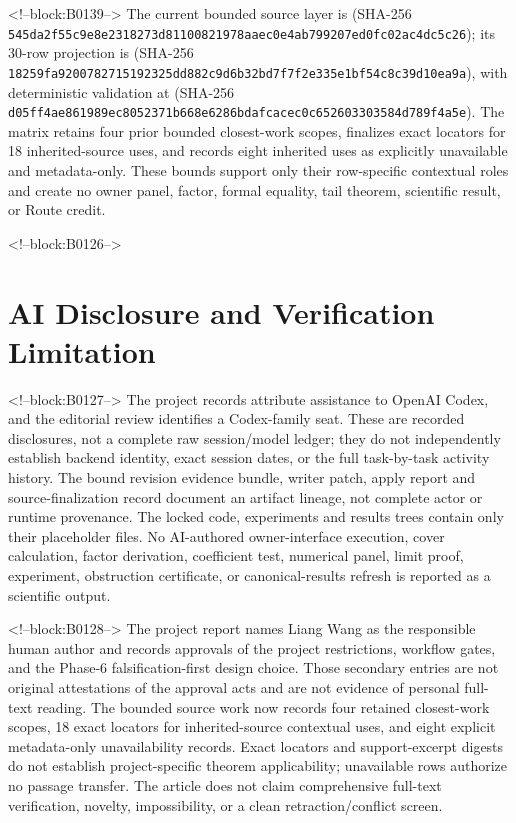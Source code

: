 \documentclass[11pt]{article}
\begin{document}
<!--block:B0139-->
The current bounded source layer is
 (SHA-256
\texttt{545da2f5\allowbreak{}5c9e8e23\allowbreak{}18273d81\allowbreak{}10082197\allowbreak{}8aaec0e4\allowbreak{}ab799207\allowbreak{}ed0fc02a\allowbreak{}c4dc5c26}); its 30-row projection is
 (SHA-256
\texttt{18259fa9\allowbreak{}20078271\allowbreak{}5192325d\allowbreak{}d882c9d6\allowbreak{}b32bd7f7\allowbreak{}f2e335e1\allowbreak{}bf54c8c3\allowbreak{}9d10ea9a}), with deterministic validation at
 (SHA-256
\texttt{d05ff4ae\allowbreak{}861989ec\allowbreak{}8052371b\allowbreak{}668e6286\allowbreak{}bdafcace\allowbreak{}c0c65260\allowbreak{}3303584d\allowbreak{}789f4a5e}).  The matrix retains four prior bounded
closest-work scopes, finalizes exact locators for 18 inherited-source uses, and
records eight inherited uses as explicitly unavailable and metadata-only. These
bounds support only their row-specific contextual roles and create no owner panel,
factor, formal equality, tail theorem, scientific result, or Route credit.
\par\endgroup

<!--block:B0126-->
\hypertarget{ai-disclosure-and-verification-limitation}{%
\section*{AI Disclosure and Verification
Limitation}\label{ai-disclosure-and-verification-limitation}}

<!--block:B0127-->
The project records attribute assistance to OpenAI Codex, and the editorial
review identifies a Codex-family seat. These are recorded disclosures, not a
complete raw session/model ledger; they do not independently establish backend
identity, exact session dates, or the full task-by-task activity history. The
bound revision evidence bundle, writer patch, apply report and source-finalization
record document an artifact lineage, not complete actor or runtime provenance.
The locked code, experiments and results trees contain only their placeholder
files. No AI-authored owner-interface execution, cover calculation, factor
derivation, coefficient test, numerical panel, limit proof, experiment, obstruction
certificate, or canonical-results refresh is reported as a scientific output.

<!--block:B0128-->
The project report names Liang Wang as the responsible human author and records
approvals of the project restrictions, workflow gates, and the Phase-6
falsification-first design choice. Those secondary entries are not original
attestations of the approval acts and are not evidence of personal full-text
reading.
The bounded source work now records four retained closest-work scopes, 18 exact
locators for inherited-source contextual uses, and eight explicit metadata-only
unavailability records. Exact locators and support-excerpt digests do not establish
project-specific theorem applicability; unavailable rows authorize no passage
transfer. The article does not claim comprehensive full-text verification, novelty,
impossibility, or a clean retraction/conflict screen.
\end{document}
